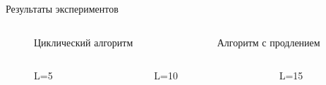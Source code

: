 \documentclass[10pt]{beamer}
\begin{document}
\begin{frame}[allowframebreaks]{Результаты экспериментов}
\begin{columns}
    \begin{column}{0.48\textwidth}
        \begin{figure}[h]
    \centering
    \caption{Циклический алгоритм}
    \label{VK:fig:1}
  \end{figure}
    \end{column}
    \begin{column}{0.48\textwidth}
        \begin{figure}[h]
    \centering
    \caption{Алгоритм с продлением}
    \label{VK:fig:1}
  \end{figure}
    \end{column}
\end{columns}
\framebreak

\begin{columns}
    \begin{column}{0.33\textwidth}
        \begin{figure}[h]
    \centering
    \caption{L=5}
    \label{VK:fig:1}
  \end{figure}
    \end{column}
    \begin{column}{0.33\textwidth}
        \begin{figure}[h]
    \centering
    \caption{L=10}
    \label{VK:fig:1}
  \end{figure}
    \end{column}
        \begin{column}{0.33\textwidth}
        \begin{figure}[h]
    \centering
    \caption{L=15}
    \label{VK:fig:1}
  \end{figure}
    \end{column}
\end{columns}


\end{frame}
\end{document}
